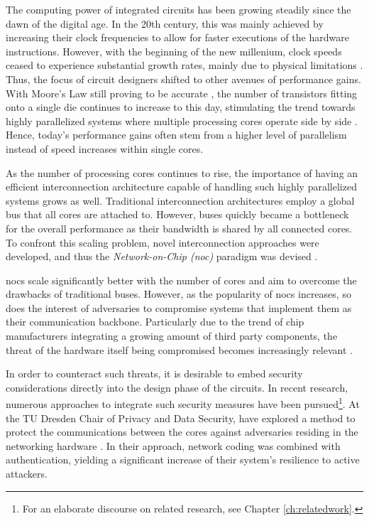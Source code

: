 The computing power of integrated circuits has been growing steadily since the dawn of the digital age. In the 20th century, this was mainly achieved
by increasing their clock frequencies to allow for faster executions of the hardware instructions. However, with the beginning of the new millenium,
clock speeds ceased to experience substantial growth rates, mainly due to physical limitations \cite{intelfrequency}. Thus, the focus of circuit
designers shifted to other avenues of performance gains. With Moore's Law still proving to be accurate \cite{mack11mooreslaw}, the number of
transistors fitting onto a single die continues to increase to this day, stimulating the trend towards highly parallelized systems where multiple
processing cores operate side by side \cite[6]{kumar08parallel}. Hence, today's performance gains often stem from a higher level of parallelism
instead of speed increases within single cores.

As the number of processing cores continues to rise, the importance of having an efficient interconnection architecture capable of handling such
highly parallelized systems grows as well. Traditional interconnection architectures employ a global bus that all cores are attached to. However,
buses quickly became a bottleneck for the overall performance \cite[6]{tatas16designingnocs} as their bandwidth is shared by all connected cores. To confront this
scaling problem, novel interconnection approaches were developed, and thus the \textit{Network-on-Chip (\gls{noc})} paradigm was devised
\cites{kumar02networkonchip}{benini02nocparadigm}.

\Glspl{noc} scale significantly better with the number of cores and aim to overcome the drawbacks of traditional buses. However, as the popularity of
\glspl{noc} increases, so does the interest of adversaries to compromise systems
that implement them as their communication backbone. Particularly due to the trend of chip manufacturers integrating a growing amount of third party components, the
threat of the hardware itself being compromised becomes increasingly relevant \cites{ancajas14fortnocs}{sethumadhavan15trustworthyhardware}.

In order to counteract such threats, it is desirable to embed security considerations directly into the design phase of the circuits. In recent
research, numerous approaches to integrate such security measures have been pursued\footnote{For an elaborate
discourse on related research, see Chapter \ref{ch:relatedwork}.}. At the TU Dresden Chair of Privacy and Data Security,
\citeauthor{moriam18activeattackers} have explored a method to protect the communications between the cores against adversaries residing in the networking
hardware \cites{moriam15manycorenc}{moriam18activeattackers}. In their approach, network coding was combined with authentication, yielding a
significant increase of their system's resilience to active attackers.

